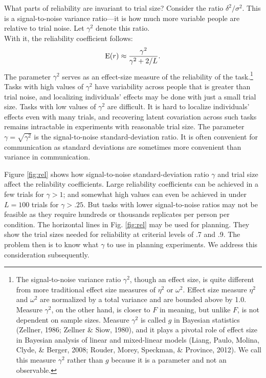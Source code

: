 \documentclass[
  ,man]{apa6}
\begin{document}
What parts of reliability are invariant to trial size? Consider the ratio \(\delta^2/\sigma^2\). This is a signal-to-noise variance ratio---it is how much more variable people are relative to trial noise. Let \(\gamma^2\) denote this ratio.\\
With it, the reliability coefficient follows:
\[
\mbox{E}(r)\approx\frac{\gamma^2}{\gamma^2+2/L}.
\]
The parameter \(\gamma^2\) serves as an effect-size measure of the reliability of the task.\footnote{The signal-to-noise variance ratio \(\gamma^2\), though an effect size, is quite different from more traditional effect size measures of \(\eta^2\) or \(\omega^2\). Effect size measure \(\eta^2\) and \(\omega^2\) are normalized by a total variance and are bounded above by 1.0. Measure \(\gamma^2\), on the other hand, is closer to \(F\) in meaning, but unlike \(F\), is not dependent on sample sizes. Measure \(\gamma^2\) is called \(g\) in Bayesian statistics (Zellner, 1986; Zellner \& Siow, 1980), and it plays a pivotal role of effect size in Bayesian analysis of linear and mixed-linear models (Liang, Paulo, Molina, Clyde, \& Berger, 2008; Rouder, Morey, Speckman, \& Province, 2012). We call this measure \(\gamma^2\) rather than \(g\) because it is a parameter and not an observable.} Tasks with high values of \(\gamma^2\) have variability across people that is greater than trial noise, and localizing individuals' effects may be done with just a small trial size. Tasks with low values of \(\gamma^2\) are difficult. It is hard to localize individuals' effects even with many trials, and recovering latent covariation across such tasks remains intractable in experiments with reasonable trial size. The parameter \(\gamma=\sqrt{\gamma^2}\) is the signal-to-noise standard-deviation ratio. It is often convenient for communication as standard deviations are sometimes more convenient than variance in communication.

Figure \ref{fig:rel} shows how signal-to-noise standard-deviation ratio \(\gamma\) and trial size affect the reliability coefficients. Large reliability coefficients can be achieved in a few trials for \(\gamma>1\); and somewhat high values can even be achieved in under \(L=100\) trials for \(\gamma>.25\). But tasks with lower signal-to-noise ratios may not be feasible as they require hundreds or thousands replicates per person per condition. The horizontal lines in Fig. \ref{fig:rel} may be used for planning. They show the trial sizes needed for reliability at criterial levels of .7 and .9. The problem then is to know what \(\gamma\) to use in planning experiments. We address this consideration subsequently.
\end{document}
